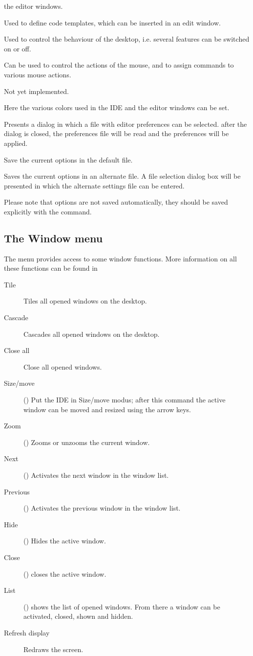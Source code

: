 \begin{description}
\begin{description}
the editor windows.
\item[Codetemplates]
Used to define code templates, which can be inserted in an edit window.
\item[Desktop]
Used to control the behaviour of the desktop, i.e. several features can be
switched on or off.
\item[Mouse]
Can be used to control the actions of the mouse, and to assign commands to
various mouse actions.
\item[Startup]
Not yet implemented.
\item[Colors]
Here the various colors used in the IDE and the editor windows can be set.
\end{description}
\item[Open]
Presents a dialog in which a file with editor preferences can be selected. 
after the dialog is closed, the preferences file will be read and the
preferences will be applied.
\item[Save]
Save the current options in the default file.
\item[Save as]
Saves the current options in an alternate file. A file selection dialog box
will be presented in which the alternate settings file can be entered.
\end{description}
Please note that options are not saved automatically, they should be saved
explicitly with the  command.
%
%
\subsection{The Window menu}
\label{se:menuwindow}
The  menu provides access to some window functions. More information
on all these functions can be found in 
\begin{description}
\item[Tile]
Tiles all opened windows on the desktop.
\item[Cascade]
Cascades all opened windows on the desktop.
\item[Close all]
Close all opened windows.
\item[Size/move] ()
Put the IDE in Size/move modus; after this command the active window can be
moved and resized using the arrow keys.
\item[Zoom] ()
Zooms or unzooms the current window. 
\item[Next] ()
Activates the next window in the window list.
\item[Previous] ()
Activates the previous window in the window list.
\item[Hide] ()
Hides the active window. 
\item[Close] () closes the active window.
\item[List] () shows the list of opened windows. From there a
window can be activated, closed, shown and hidden.
\item[Refresh display]
Redraws the screen.
\end{description}
%
%
